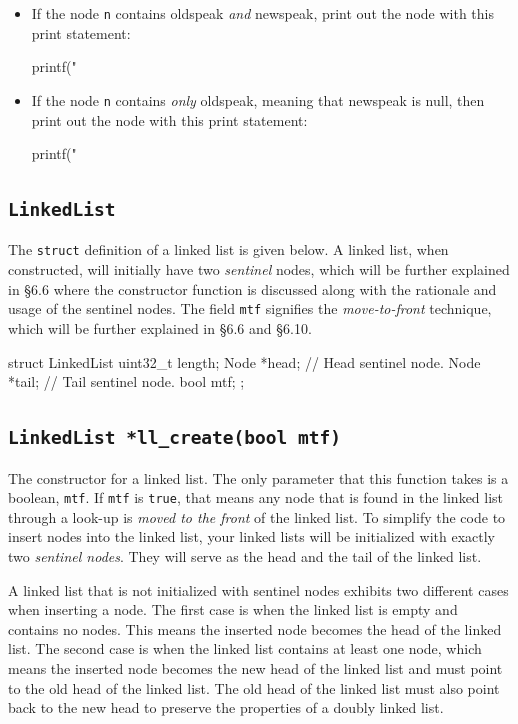 \documentclass{article}
\begin{document}
\begin{itemize}
  \item If the node \texttt{n} contains oldspeak \emph{and} newspeak,
    print out the node with this print statement:
    \begin{codelisting}{}
printf("%
    \end{codelisting}
  \item If the node \texttt{n} contains \emph{only} oldspeak, meaning
    that newspeak is null, then print out the node with this print
    statement:
    \begin{codelisting}{}
printf("%
    \end{codelisting}
\end{itemize}

\subsection{\texttt{LinkedList}}

The \texttt{struct} definition of a linked list is given below. A
linked list, when constructed, will initially have two \emph{sentinel}
nodes, which will be further explained in \S 6.6 where the constructor
function is discussed along with the rationale and usage of the sentinel
nodes. The field \texttt{mtf} signifies the \emph{move-to-front}
technique, which will be further explained in \S 6.6 and \S 6.10.

\begin{codelisting}{}
struct LinkedList {
  uint32_t length;
  Node *head; // Head sentinel node.
  Node *tail; // Tail sentinel node.
  bool mtf;
};
\end{codelisting}

\subsection{\texttt{LinkedList *ll\_create(bool mtf)}}

The constructor for a linked list. The only parameter that this function
takes is a boolean, \texttt{mtf}. If \texttt{mtf} is \texttt{true}, that
means any node that is found in the linked list through a look-up is
\emph{moved to the front} of the linked list. To simplify the code to
insert nodes into the linked list, your linked lists will be initialized
with exactly two \emph{sentinel nodes}. They will serve as the head and
the tail of the linked list.

A linked list that is not initialized with sentinel nodes exhibits two
different cases when inserting a node. The first case is when the linked
list is empty and contains no nodes. This means the inserted node
becomes the head of the linked list. The second case is when the linked
list contains at least one node, which means the inserted node becomes
the new head of the linked list and must point to the old head of the
linked list. The old head of the linked list must also point back to the
new head to preserve the properties of a doubly linked list.
\end{document}
